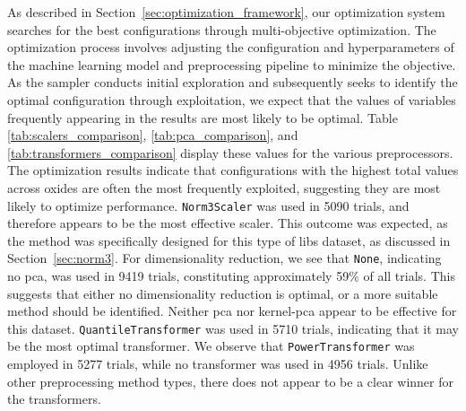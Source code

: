 As described in Section~\ref{sec:optimization_framework}, our optimization system searches for the best configurations through multi-objective optimization.
The optimization process involves adjusting the configuration and hyperparameters of the machine learning model and preprocessing pipeline to minimize the objective.
As the sampler conducts initial exploration and subsequently seeks to identify the optimal configuration through exploitation, we expect that the values of variables frequently appearing in the results are most likely to be optimal.
Table \ref{tab:scalers_comparison}, \ref{tab:pca_comparison}, and \ref{tab:transformers_comparison} display these values for the various preprocessors.
The optimization results indicate that configurations with the highest total values across oxides are often the most frequently exploited, suggesting they are most likely to optimize performance.
\texttt{Norm3Scaler} was used in 5090 trials, and therefore appears to be the most effective scaler.
This outcome was expected, as the method was specifically designed for this type of \gls{libs} dataset, as discussed in Section~\ref{sec:norm3}.
For dimensionality reduction, we see that \texttt{None}, indicating no \gls{pca}, was used in 9419 trials, constituting approximately 59\% of all trials.
This suggests that either no dimensionality reduction is optimal, or a more suitable method should be identified.
Neither \gls{pca} nor \gls{kernel-pca} appear to be effective for this dataset.
\texttt{QuantileTransformer} was used in 5710 trials, indicating that it may be the most optimal transformer.
We observe that \texttt{PowerTransformer} was employed in 5277 trials, while no transformer was used in 4956 trials. Unlike other preprocessing method types, there does not appear to be a clear winner for the transformers.



